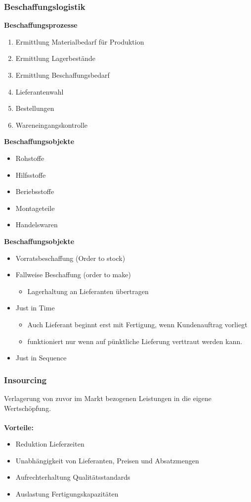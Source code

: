 \documentclass[../ZF_Wing.tex]{subfiles}
\begin{document}
\subsubsection{Beschaffungslogistik}
\colorbox{green!30}{\textbf{Beschaffungsprozesse}}

\begin{enumerate}
	\item Ermittlung Materialbedarf für Produktion
	\item Ermittlung Lagerbestände
	\item Ermittlung Beschaffungsbedarf
	\item Lieferantenwahl
	\item Bestellungen
	\item Wareneingangskontrolle
\end{enumerate}
\colorbox{green!30}{\textbf{Beschaffungsobjekte}}
\begin{itemize}
	\item Rohstoffe
	\item Hilfsstoffe
	\item Beriebsstoffe
	\item Montageteile
	\item Handelswaren
\end{itemize}
\colorbox{green!30}{\textbf{Beschaffungsobjekte}}
\begin{itemize}
	\item Vorratsbeschaffung (Order to stock)
	\item Fallweise Beschaffung (order to make)
	\begin{itemize}
		\item Lagerhaltung an Lieferanten übertragen
	\end{itemize}
	\item Just in Time
	\begin{itemize}
		\item Auch Lieferant beginnt erst mit Fertigung, wenn Kundenauftrag vorliegt
		\item funktioniert nur wenn auf pünktliche Lieferung verttraut werden kann.
	\end{itemize}
	\item Just in Sequence
\end{itemize}

\subsubsection{Insourcing}
Verlagerung von zuvor im Markt bezogenen Leistungen in die eigene Wertschöpfung.\\\\
\textbf{Vorteile:}
\begin{itemize}
	\item Reduktion Lieferzeiten
	\item Unabhängigkeit von Lieferanten, Preisen und Absatzmengen
	\item Aufrechterhaltung Qualitätsstandards
	\item Auslastung Fertigungskapazitäten
\end{itemize}
\end{document}
